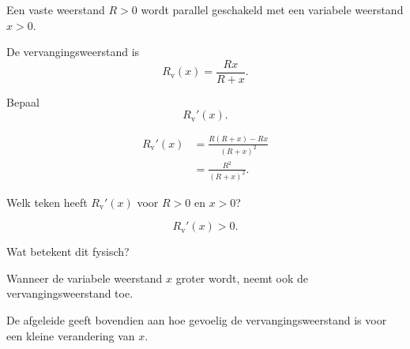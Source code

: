 \documentclass{ximera}
\begin{document}
\begin{oefening}{\oefU}

Een vaste weerstand $R>0$ wordt parallel geschakeld met een
variabele weerstand $x>0$.

De vervangingsweerstand is
\[
R_{\mathrm{v}}(x)
=
\frac{Rx}{R+x}.
\]

\begin{question}
Bepaal
\[
R_{\mathrm{v}}'(x).
\]

\begin{oplossing}
\[
\begin{aligned}
R_{\mathrm{v}}'(x)
&=
\frac{
R(R+x)-Rx
}{
(R+x)^2
}\\
&=
\boxed{
\frac{R^2}{(R+x)^2}
}.
\end{aligned}
\]
\end{oplossing}
\end{question}


\begin{question}
Welk teken heeft $R_{\mathrm{v}}'(x)$ voor $R>0$ en $x>0$?

\begin{oplossing}
\[
R_{\mathrm{v}}'(x)>0.
\]
\end{oplossing}
\end{question}


\begin{question}
Wat betekent dit fysisch?

\begin{oplossing}
Wanneer de variabele weerstand $x$ groter wordt, neemt ook de
vervangingsweerstand toe.

De afgeleide geeft bovendien aan hoe gevoelig de vervangingsweerstand
is voor een kleine verandering van $x$.
\end{oplossing}
\end{question}

\end{oefening}



\FVDendExercises



\FVDbeginExercises


\end{document}
